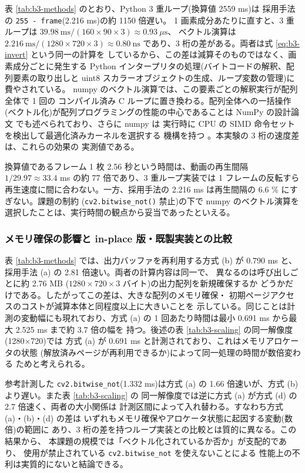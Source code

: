表 \ref{tab:b3-methods} のとおり、Python 3 重ループ(換算値 2559 ms)は
採用手法の {\tt 255 - frame}(2.216 ms)の約 1150 倍遅い。
1 画素成分あたりに直すと、3 重ループは
$39.98\ \mathrm{ms} / (160 \times 90 \times 3) \approx 0.93\ \mu\mathrm{s}$、
ベクトル演算は
$2.216\ \mathrm{ms} / (1280 \times 720 \times 3) \approx 0.80\ \mathrm{ns}$
であり、3 桁の差がある。両者は式 \ref{eq:b3-invert} という同一の計算を
しているから、この差は減算そのものではなく、画素成分ごとに発生する
Python インタープリタの処理(バイトコードの解釈、配列要素の取り出しと
uint8 スカラーオブジェクトの生成、ループ変数の管理)に費やされている。
numpy のベクトル演算では、この要素ごとの解釈実行が配列全体で 1 回の
コンパイル済み C ループに置き換わる。配列全体への一括操作
(ベクトル化)が配列プログラミングの性能の中心であることは
NumPy の設計論文 \cite{b3-numpy} でも述べられており、さらに numpy は
実行時に CPU の SIMD 命令セットを検出して最適化済みカーネルを選択する
機構を持つ \cite{b3-simd}。本実験の 3 桁の速度差は、これらの効果の
実測値である。

換算値であるフレーム 1 枚 2.56 秒という時間は、動画の再生間隔
$1/29.97 \approx 33.4$ ms の約 77 倍であり、3 重ループ実装では
1 フレームの反転すら再生速度に間に合わない。一方、採用手法の
2.216 ms は再生間隔の 6.6 \% にすぎない。課題の制約
({\tt cv2.bitwise\_not()} 禁止)の下で numpy のベクトル演算を
選択したことは、実行時間の観点から妥当であったといえる。

\subsubsection{メモリ確保の影響と in-place 版・既製実装との比較}

表 \ref{tab:b3-methods} では、出力バッファを再利用する方式 (b) が
0.790 ms と、採用手法 (a) の 2.81 倍速い。両者の計算内容は同一で、
異なるのは呼び出しごとに約 2.76 MB
($1280 \times 720 \times 3$ バイト)の出力配列を新規確保するか
どうかだけである。したがってこの差は、大きな配列のメモリ確保・
初期ページアクセスのコストが減算本体と同程度以上に大きいことを
示している。同じことは計測の変動幅にも現れており、方式 (a) の
1 回あたり時間は最小 0.691 ms から最大 2.525 ms まで約 3.7 倍の幅を
持つ。後述の表 \ref{tab:b3-scaling} の同一解像度(1280$\times$720)では
方式 (a) が 0.691 ms と計測されており、これはメモリアロケータの状態
(解放済みページが再利用できるか)によって同一処理の時間が数倍変わる
ためと考えられる。

参考計測した {\tt cv2.bitwise\_not}(1.332 ms)は方式 (a) の
1.66 倍速いが、方式 (b) より遅い。また表 \ref{tab:b3-scaling} の
同一解像度では逆に方式 (a) が方式 (d) の 2.7 倍速く、両者の大小関係は
計測区間によって入れ替わる。すなわち方式 (a)・(b)・(d) の差は
いずれもメモリ確保やアロケータ状態に起因する変動(数倍)の範囲に
あり、3 桁の差を持つループ実装との比較とは質的に異なる。この結果から、
本課題の規模では「ベクトル化されているか否か」が支配的であり、
使用が禁止されている {\tt cv2.bitwise\_not} を使えないことによる
性能上の不利は実質的にないと結論できる。

